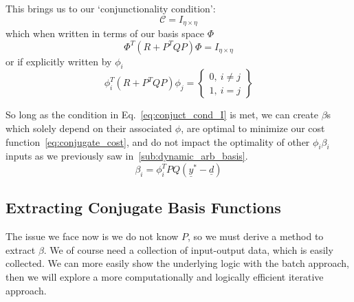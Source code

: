This brings us to our `conjunctionality condition':
\begin{equation}
    \mathcal{C} = I_{\eta \times \eta}
\end{equation}
which when written in terms of our basis space $\Phi$
\begin{equation}
    \Phi^T \left(R + P^T QP\right) \Phi = I_{\eta \times \eta}
    \label{eq:conjuct_cond_I}
\end{equation}
or if explicitly written by $\phi_i$
\begin{equation}
    \phi_i^T \left(R + P^T QP\right) \phi_j =
    \begin{Bmatrix}
        0,\ i \neq j \\
        1,\ i = j
    \end{Bmatrix}
\end{equation}

So long as the condition in Eq.~\ref{eq:conjuct_cond_I} is met, we can create $\beta$s which solely depend on their associated $\phi$, are optimal to minimize our cost function~\ref{eq:conjugate_cost}, and do not impact the optimality of other $\phi_i \beta_i$ inputs as we previously saw in~\ref{sub:dynamic_arb_basis}.
\begin{equation}
    \beta_i = \phi_i^T P Q (\underline{y}^\ast - \underline{d})
    \label{eq:optimal_beta_lql}
\end{equation}

\FloatBarrier\subsection{Extracting Conjugate Basis Functions}
The issue we face now is we do not know $P$, so we must derive a method to extract $\beta$. We of course need a collection of input-output data, which is easily collected. We can more easily show the underlying logic with the batch approach, then we will explore a more computationally and logically efficient iterative approach.


